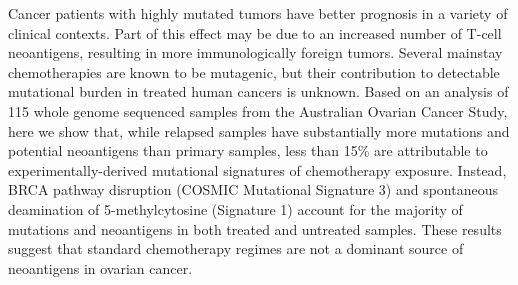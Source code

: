 Cancer patients with highly mutated tumors have better prognosis in a variety of clinical contexts. Part of this effect may be due to an increased number of T-cell neoantigens, resulting in more immunologically foreign tumors. Several mainstay chemotherapies are known to be mutagenic, but their contribution to detectable mutational burden in treated human cancers is unknown. Based on an analysis of 115 whole genome sequenced samples from the Australian Ovarian Cancer Study, here we show that, while relapsed samples have substantially more mutations and potential neoantigens than primary samples, less than 15\% are attributable to experimentally-derived mutational signatures of chemotherapy exposure. Instead, BRCA pathway disruption (COSMIC Mutational Signature 3) and spontaneous deamination of 5-methylcytosine (Signature 1) account for the majority of mutations and neoantigens in both treated and untreated samples. These results suggest that standard chemotherapy regimes are not a dominant source of neoantigens in ovarian cancer.

